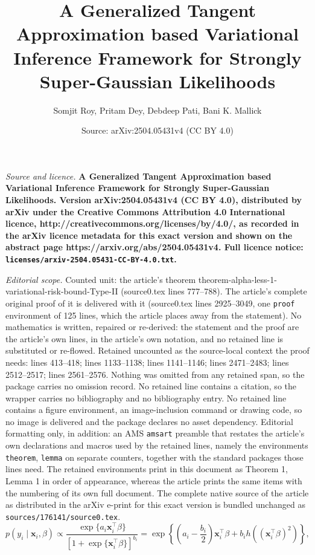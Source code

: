 \documentclass[10pt,a4paper]{amsart}
\title{\bf A Generalized Tangent Approximation based Variational Inference Framework for Strongly Super-Gaussian Likelihoods}
\author{Somjit Roy, Pritam Dey, Debdeep Pati, Bani K. Mallick}
\date{Source: arXiv:2504.05431v4 (CC BY 4.0)}
\begin{document}
\maketitle

\noindent\emph{Source and licence.} \bf A Generalized Tangent Approximation based Variational Inference Framework for Strongly Super-Gaussian Likelihoods. Version arXiv:2504.05431v4 (CC BY 4.0), distributed by arXiv under the Creative Commons Attribution 4.0 International licence, http://creativecommons.org/licenses/by/4.0/, as recorded in the arXiv licence metadata for this exact version and shown on the abstract page https://arxiv.org/abs/2504.05431v4. Full licence notice: \texttt{licenses/arxiv-2504.05431-CC-BY-4.0.txt}.\par\smallskip

\noindent\textit{Editorial scope.} Counted unit: the article's theorem theorem-alpha-less-1-variational-risk-bound-Type-II (source0.tex lines 777--788). The article's complete original proof of it is delivered with it (source0.tex lines 2925--3049, one \texttt{proof} environment of 125 lines, which the article places away from the statement). No mathematics is written, repaired or re-derived: the statement and the proof are the article's own lines, in the article's own notation, and no retained line is substituted or re-flowed.  Retained uncounted as the source-local context the proof needs: lines 413--418; lines 1133--1138; lines 1141--1146; lines 2471--2483; lines 2512--2517; lines 2561--2576.  Nothing was omitted from any retained span, so the package carries no omission record.  No retained line contains a citation, so the wrapper carries no bibliography and no bibliography entry.  No retained line contains a figure environment, an image-inclusion command or drawing code, so no image is delivered and the package declares no asset dependency.  Editorial formatting only, in addition: an AMS \texttt{amsart} preamble that restates the article's own declarations and macros used by the retained lines, namely the environments \texttt{theorem}, \texttt{lemma} on separate counters, together with the standard packages those lines need.  The retained environments print in this document as Theorem 1, Lemma 1 in order of appearance, whereas the article prints the same items with the numbering of its own full document.  The complete native source of the article as distributed in the arXiv e-print for this exact version is bundled unchanged as \texttt{sources/176141/source0.tex}.
\begin{equation}
\label{eq:SSG-typeII-likelihood}
p(y_i \mid \mathbf{x}_i, \beta) \propto 
\frac{\exp\{a_i \mathbf{x}_i^{\top}\beta\}}{\left[1 + \exp\{\mathbf{x}_i^{\top}\beta\}\right]^{b_i}} 
= \exp\left\{\left(a_i-\frac{b_i}{2}\right)\mathbf{x}_i^{\top}\beta + b_i h\left((\mathbf{x}_i^{\top}\beta)^2\right)\right\},
\end{equation}
\end{document}
